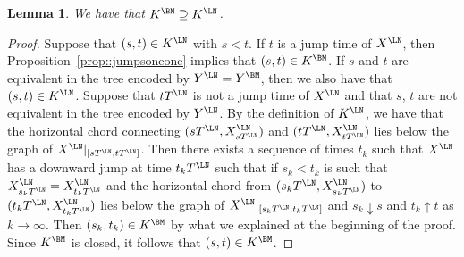 \documentclass[10pt]{amsart}
\theoremstyle{plain}
\numberwithin{theorem}{section}
\newtheorem{lemma}[theorem]{Lemma}
\theoremstyle{definition}
\begin{document}
\begin{lemma}
\label{lem:levy_net_jump_equiv_dense}
We have that $K^\BM \supseteq K^\LN$.
\end{lemma}
\begin{proof}
Suppose that $(s,t) \in K^\LN$ with $s < t$. If $t$ is a jump time of $X^\LN$, then Proposition~\ref{prop::jumpsoneone} implies that $(s,t) \in K^\BM$. If $s$ and $t$ are equivalent in the tree encoded by $Y^\LN = Y^\BM$, then we also have that $(s,t) \in K^\LN$. Suppose that $t T^\LN$ is not a jump time of $X^\LN$ and that $s$, $t$ are not equivalent in the tree encoded by $Y^\LN$. By the definition of $K^\LN$, we have that the horizontal chord connecting $(s T^\LN,X_{s T^\LN}^\LN)$ and $(t T^\LN,X_{t T^\LN}^\LN)$ lies below the graph of $X^\LN|_{[sT^\LN,t T^\LN]}$. Then there exists a sequence of times $t_k$ such that $X^\LN$ has a downward jump at time $t_k T^\LN$ such that if $s_k < t_k$ is such that $X_{s_k T^\LN}^\LN = X_{t_k T^\LN}^\LN$ and the horizontal chord from $(s_k T^\LN,X_{s_k T^\LN}^\LN)$ to $(t_k T^\LN,X_{t_k T^\LN}^\LN)$ lies below the graph of $X^\LN|_{[s_k T^\LN,t_k T^\LN]}$ and $s_k \downarrow s$ and $t_k \uparrow t$ as $k \to \infty$. Then $(s_k,t_k) \in K^\BM$ by what we explained at the beginning of the proof. Since $K^\BM$ is closed, it follows that $(s,t) \in K^\BM$.
\end{proof}
\end{document}
